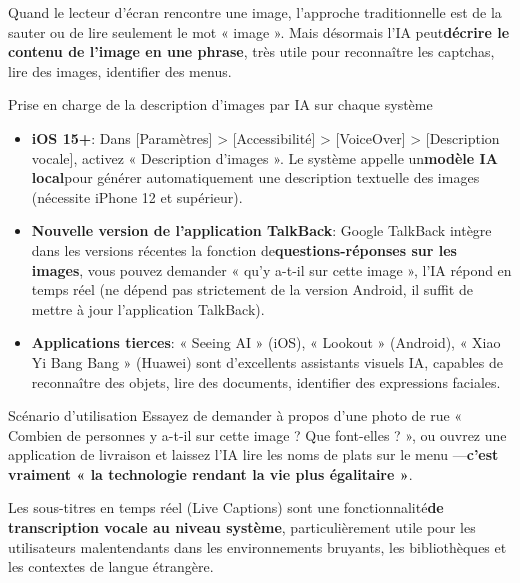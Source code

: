 
Quand le lecteur d'écran rencontre une image, l'approche traditionnelle est de la sauter ou de lire seulement le mot « image ». Mais désormais l'IA peut\textbf{décrire le contenu de l'image en une phrase}, très utile pour reconnaître les captchas, lire des images, identifier des menus.

\begin{tcbinfo}{Prise en charge de la description d'images par IA sur chaque système}
\begin{itemize}
  \item \textbf{iOS 15+}: Dans [Paramètres] > [Accessibilité] > [VoiceOver] > [Description vocale], activez « Description d'images ». Le système appelle un\textbf{modèle IA local}pour générer automatiquement une description textuelle des images (nécessite iPhone 12 et supérieur).
  \item \textbf{Nouvelle version de l'application TalkBack}: Google TalkBack intègre dans les versions récentes la fonction de\textbf{questions-réponses sur les images}, vous pouvez demander « qu'y a-t-il sur cette image », l'IA répond en temps réel (ne dépend pas strictement de la version Android, il suffit de mettre à jour l'application TalkBack).
  \item \textbf{Applications tierces}: « Seeing AI » (iOS), « Lookout » (Android), « Xiao Yi Bang Bang » (Huawei) sont d'excellents assistants visuels IA, capables de reconnaître des objets, lire des documents, identifier des expressions faciales.
\end{itemize}

\end{tcbinfo}

\begin{tcbpractice}{Scénario d'utilisation}
Essayez de demander à propos d'une photo de rue « Combien de personnes y a-t-il sur cette image ? Que font-elles ? », ou ouvrez une application de livraison et laissez l'IA lire les noms de plats sur le menu —\textbf{c'est vraiment « la technologie rendant la vie plus égalitaire »}.

\end{tcbpractice}


Les sous-titres en temps réel (Live Captions) sont une fonctionnalité\textbf{de transcription vocale au niveau système}, particulièrement utile pour les utilisateurs malentendants dans les environnements bruyants, les bibliothèques et les contextes de langue étrangère.

